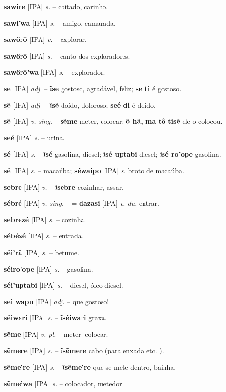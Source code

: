 \textbf{sawire} [IPA] \textit{s.} -- coitado, carinho.

\textbf{sawi'wa} [IPA] \textit{s.} -- amigo, camarada.

\textbf{sawörö} [IPA] \textit{v.} -- explorar.

\textbf{sawörö} [IPA] \textit{s.} -- canto dos exploradores.

\textbf{sawörö'wa} [IPA] \textit{s.} -- explorador.

\textbf{se} [IPA] \textit{adj.} -- \textbf{ĩse} gostoso, agradável, feliz; \textbf{se ti} é gostoso.

\textbf{sẽ} [IPA] \textit{adj.} -- \textbf{ĩsẽ} doído, doloroso; \textbf{seé di} é doído.

\textbf{sẽ} [IPA] \textit{v. sing.} -- \textbf{sẽme} meter, colocar; \textbf{õ hã, ma tô tisẽ} ele o colocou.

\textbf{seé} [IPA] \textit{s.} -- urina.

\textbf{sé} [IPA] \textit{s.} -- \textbf{ĩsé} gasolina, diesel; \textbf{ĩsé uptabi} diesel; \textbf{ĩsé ro'ope} gasolina.

\textbf{sé} [IPA] \textit{s.} -- macaúba; \textbf{séwaipo} [IPA] \textit{s.} broto de macaúba.

\textbf{sebre} [IPA] \textit{v.} -- \textbf{ĩsebre} cozinhar, assar.

\textbf{sébré} [IPA] \textit{v. sing.} -- = \textbf{dazasi} [IPA] \textit{v. du.} entrar.

\textbf{sebrezé} [IPA] \textit{s.} -- cozinha.

\textbf{sébézé} [IPA] \textit{s.} -- entrada.

\textbf{séi'rã} [IPA] \textit{s.} -- betume.

\textbf{séiro'ope} [IPA] \textit{s.} -- gasolina.

\textbf{séi'uptabi} [IPA] \textit{s.} -- diesel, óleo diesel.

\textbf{sei wapu} [IPA] \textit{adj.} -- que gostoso!

\textbf{séiwari} [IPA] \textit{s.} -- \textbf{ĩséiwari} graxa.

\textbf{sẽme} [IPA] \textit{v. pl.} -- meter, colocar.

\textbf{sẽmere} [IPA] \textit{s.} -- \textbf{ĩsẽmere} cabo (para enxada etc. ).

\textbf{sẽme're} [IPA] \textit{s.} -- \textbf{ĩsẽme're} que se mete dentro, bainha.

\textbf{sẽme'wa} [IPA] \textit{s.} -- colocador, metedor.

